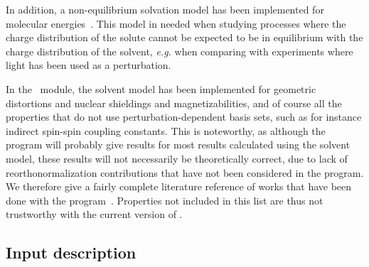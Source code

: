 In addition, a non-equilibrium
solvation model has been implemented
for molecular energies~\cite{kvmachahjajjcp103}. This model in needed
when studying processes where the charge distribution of the solute
cannot be expected to be in equilibrium with the charge distribution
of the solvent, {\it e.g.\/} when comparing with experiments where light has
been used as a perturbation.

In the \aba\ module, the solvent model has been implemented for
geometric distortions and nuclear shieldings and
magnetizabilities,
and of course all the
properties that do not use perturbation-dependent basis
sets, such as for
instance indirect spin-spin coupling 
constants. This is noteworthy, as
although the program will probably give results for most results
calculated using the solvent  model, these results will not
necessarily be theoretically correct, due to lack of reorthonormalization
contributions that have not been considered in the program. We
therefore give a fairly complete literature reference of works that
have been done with the
program~\cite{kvmpjkrthjcp106,poakvmkrthjpc100}. Properties not
included in this list are thus not trustworthy with the current
version of {\dalton}.

\subsection{Input description}\label{sec:solventinp}

